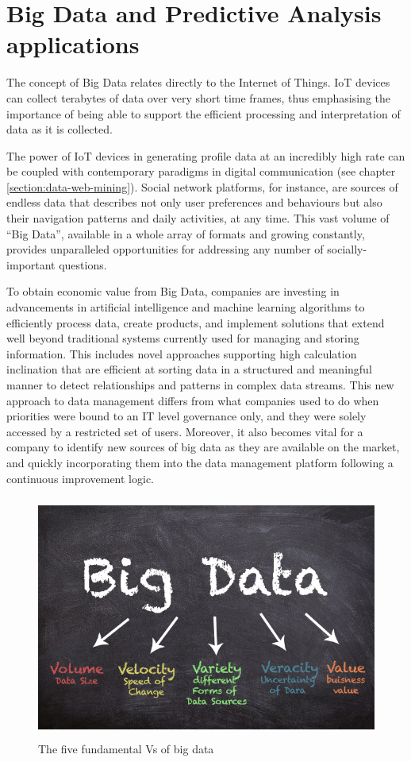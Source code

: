 \section{Big Data and Predictive Analysis applications}

The concept of Big Data relates directly to the Internet of Things. IoT devices can collect terabytes of data over very short time frames, thus emphasising the importance of being able to support the efficient processing and interpretation of data as it is collected.

The power of IoT devices in generating profile data at an incredibly high rate can be coupled with contemporary paradigms in digital communication (see chapter \ref{section:data-web-mining}). Social network platforms, for instance, are sources of endless data that describes not only user preferences and behaviours but also their navigation patterns and daily activities, at any time. This vast volume of ``Big Data”, available in a whole array of formats and growing constantly, provides unparalleled opportunities for addressing any number of socially-important questions.

To obtain economic value from Big Data, companies are investing in advancements in artificial intelligence and machine learning algorithms to efficiently process data, create products, and implement solutions that extend well beyond traditional systems currently used for managing and storing information. This includes novel approaches supporting high calculation inclination that are efficient at sorting data in a structured and meaningful manner to detect relationships and patterns in complex data streams. This new approach to data management differs from what companies used to do when priorities were bound to an IT level governance only, and they were solely accessed by a restricted set of users. Moreover, it also becomes vital for a company to identify new sources of big data as they are available on the market, and quickly incorporating them into the data management platform following a continuous improvement logic.

\vspace{0.5cm}
\begin{figure}[htbp]
  \centering
    \includegraphics[height=8cm]{images/bigdata.png}
  \caption{The five fundamental Vs of big data }
  \label{fig:bigdata}
\end{figure}
\vspace{0.5cm}

